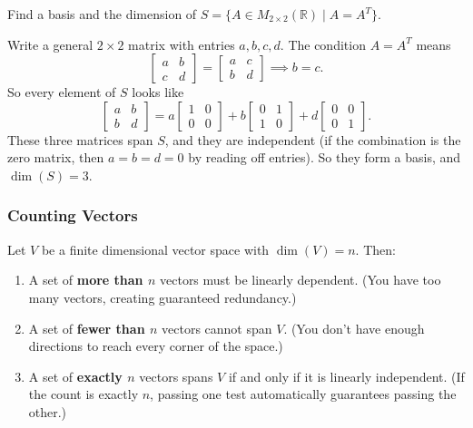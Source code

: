 \begin{example}
Find a basis and the dimension of $S = \{A \in M_{2 \times 2}(\mathbb{R}) \mid A = A^T\}$.

\begin{solution}
Write a general $2 \times 2$ matrix with entries $a, b, c, d$. The condition $A = A^T$ means
\[
\begin{bmatrix} a & b \\ c & d \end{bmatrix} = \begin{bmatrix} a & c \\ b & d \end{bmatrix}
\implies b = c.
\]
So every element of $S$ looks like
\[
\begin{bmatrix} a & b \\ b & d \end{bmatrix}
= a\begin{bmatrix} 1 & 0 \\ 0 & 0 \end{bmatrix}
+ b\begin{bmatrix} 0 & 1 \\ 1 & 0 \end{bmatrix}
+ d\begin{bmatrix} 0 & 0 \\ 0 & 1 \end{bmatrix}.
\]
These three matrices span $S$, and they are independent (if the combination is the zero matrix, then $a = b = d = 0$ by reading off entries). So they form a basis, and $\dim(S) = 3$.
\end{solution}
\end{example}

\subsubsection{Counting Vectors}

\begin{theorem}\label{thm:L3-count}
Let $V$ be a finite dimensional vector space with $\dim(V) = n$. Then:
\begin{enumerate}
    \item A set of \textbf{more than $n$} vectors must be linearly dependent. (You have too many vectors, creating guaranteed redundancy.)
    \item A set of \textbf{fewer than $n$} vectors cannot span $V$. (You don't have enough directions to reach every corner of the space.)
    \item A set of \textbf{exactly $n$} vectors spans $V$ if and only if it is linearly independent. (If the count is exactly $n$, passing one test automatically guarantees passing the other.)
\end{enumerate}
\end{theorem}

